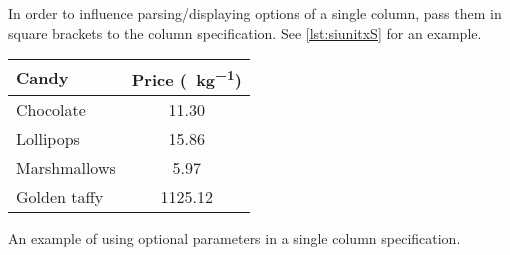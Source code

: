 In order to influence parsing\slash{}displaying options of a
single column, pass them in square brackets to the column specification. See
\autoref{lst:siunitxS} for an example.
\begin{listing}
  \begin{example}[examplewidth=0.8\linewidth, vertical_mode]
\DeclareSIUnit{\eur}{\euro}
\begin{tabular} {
    @{}l
    S[output-decimal-marker={,},
      per-mode=symbol]@{}
  }
  \toprule
  Candy        & {Price (\unit{\eur\per\kg})} \\
  \midrule
  Chocolate    & 11.30                        \\
  Lollipops    & 15.86                        \\
  Marshmallows & 5.97                         \\
  Golden taffy & 1125.12                      \\
  \bottomrule
\end{tabular}
\end{example}
  \caption{An example of using optional parameters in a single 
    column specification.}\label{lst:siunitxS}
\end{listing}

